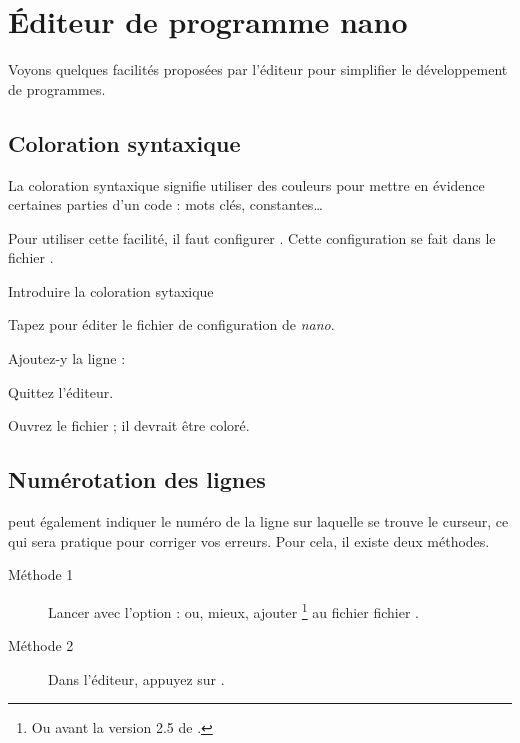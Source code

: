 \documentclass[a4paper,11pt]{style-esi/td}
\begin{document}
\section{Éditeur de programme nano}

	Voyons quelques facilités proposées par l'éditeur 
	pour simplifier le développement de programmes.

	\subsection{Coloration syntaxique}

		La coloration syntaxique signifie 
		utiliser des couleurs pour mettre en évidence certaines parties d'un code :
		mots clés, constantes\ldots
	
		Pour utiliser cette facilité, 
		il faut configurer . 
		Cette configuration se fait dans le fichier .

		\begin{Tutoriel}{Introduire la coloration sytaxique} 
			\vspace{-1em}
			\begin{steps}
			\item 
				Tapez  
				pour éditer le fichier de configuration de \emph{nano}.
			\item 
				Ajoutez-y la ligne : 
			\item 
				Quittez l'éditeur.
			\item 
				Ouvrez le fichier ;
				il devrait être coloré.
			\end{steps}
		\end{Tutoriel}
				
	\subsection{Numérotation des lignes}
				
		 peut également indiquer le numéro de la ligne 
		sur laquelle se trouve 
		le curseur, 
		ce qui sera pratique pour corriger vos erreurs. 
		Pour cela, il existe deux méthodes.

		\begin{description}
		\item[Méthode 1] 
			Lancer  avec l'option  : 
			ou, mieux, ajouter \footnote{Ou 
			 avant la version 2.5 de .} au fichier
			fichier .
		\item[Méthode 2] 
			Dans l'éditeur, appuyez sur .
		\end{description}
		
\end{document}
